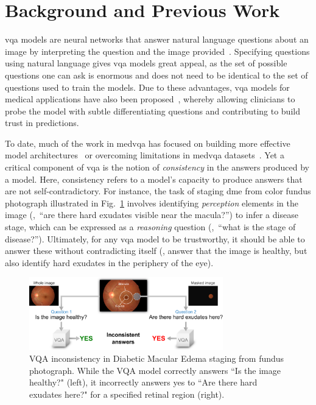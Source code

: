 \section{Background and Previous Work}
\label{sec:mainsub_intro}

\gls{vqa} models are neural networks that answer natural language questions about an image by interpreting the question and the image provided~\cite{antol2015vqa,goyal2017making,hudson2019gqa,tan2019lxmert}. Specifying questions using natural language gives \gls{vqa} models great appeal, as the set of possible questions one can ask is enormous and does not need to be identical to the set of questions used to train the models. Due to these advantages, \gls{vqa} models for medical applications have also been proposed~\cite{gong2021cross,ImageCLEFVQA_Med2018,liao2020aiml,liu2019effective,vu2020question,zhan2020medical}, whereby allowing clinicians to probe the model with subtle differentiating questions and contributing to build trust in predictions.

To date, much of the work in \gls{medvqa} has focused on building more effective model architectures~\cite{gong2021cross,liao2020aiml,vu2020question} or overcoming limitations in \gls{medvqa} datasets~\cite{Nguyen19,liao2020aiml,sarrouti2020nlm,zhan2020medical}. Yet a critical component of \gls{vqa} is the notion of {\it consistency} in the answers produced by a model. Here, consistency refers to a model's capacity to produce answers that are not self-contradictory. For instance, the task of staging \gls{dme} from color fundus photograph illustrated in Fig.~\ref{fig:motivation} involves identifying {\it perception} elements in the image (\eg,~``are there hard exudates visible near the macula?'') to infer a disease stage, which can be expressed as a {\it reasoning} question (\eg,~``what is the stage of disease?''). Ultimately, for any \gls{vqa} model to be trustworthy, it should be able to answer these without contradicting itself (\ie, answer that the image is healthy, but also identify hard exudates in the periphery of the eye).
\begin{figure}[t]
\begin{center}
\includegraphics[width=0.75\textwidth]{Figures/Part2_Consist/01_mainsub/motivation_alt.pdf}
\caption{VQA inconsistency in Diabetic Macular Edema staging from fundus photograph. While the VQA model correctly answers ``Is the image healthy?" (left), it incorrectly answers yes to ``Are there hard exudates here?" for a specified retinal region (right).}
\label{fig:motivation}
\end{center}
\end{figure}

